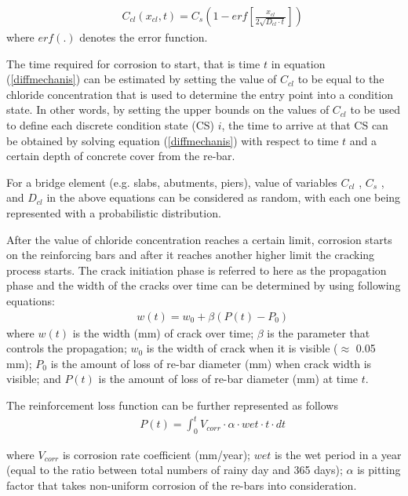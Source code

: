 \documentclass[Journal]{ascelike}
\begin{document}
\begin{eqnarray}
 &  & C_{cl}(x_{cl},t)=C_{s}\left(1-erf\left[\frac{x_{cl}}{2\sqrt{D_{cl}\cdot t}}\right]\right)\label{diffmechanis}
\end{eqnarray}
where $erf(.)$ denotes the error function.

The time required for corrosion to start, that is time $t$ in equation
(\ref{diffmechanis}) can be estimated by setting the value of $C_{cl}$
to be equal to the chloride concentration that is used to determine
the entry point into a condition state. In other words, by setting
the upper bounds on the values of $C_{cl}$ to be used to define each
discrete condition state (CS) $i$, the time to arrive at that CS
can be obtained by solving equation (\ref{diffmechanis}) with respect
to time $t$ and a certain depth of concrete cover from the re-bar.

For a bridge element (e.g. slabs, abutments, piers), value of variables
$C_{cl}$ , $C_{s}$ , and $D_{cl}$ in the above equations can be
considered as random, with each one being represented with a probabilistic
distribution.

After the value of chloride concentration reaches a certain limit,
corrosion starts on the reinforcing bars and after it reaches another
higher limit the cracking process starts. The crack initiation phase
is referred to here as the propagation phase and the width of the
cracks over time can be determined by using following equations:
\begin{eqnarray}
 &  & w(t)=w_{0}+\beta\left(P(t)-P_{0}\right)\label{crackmecha}
\end{eqnarray}
where $w(t)$ is the width (mm) of crack over time; $\beta$ is the
parameter that controls the propagation; $w_{0}$ is the width of
crack when it is visible ($\approx$ 0.05 mm); $P_{0}$ is the amount
of loss of re-bar diameter (mm) when crack width is visible; and $P(t)$
is the amount of loss of re-bar diameter (mm) at time $t$.

The reinforcement loss function can be further represented as follows
\begin{eqnarray}
 &  & P(t)=\int_{0}^{t}V_{corr}\cdot\alpha\cdot wet\cdot t\cdot dt\label{lossfunction}
\end{eqnarray}

where $V_{corr}$ is corrosion rate coefficient (mm/year); $wet$
is the wet period in a year (equal to the ratio between total numbers
of rainy day and 365 days); $\alpha$ is pitting factor that takes
non-uniform corrosion of the re-bars into consideration. 
\end{document}

